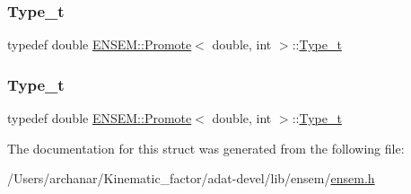 \mbox{\label{structENSEM_1_1Promote_3_01double_00_01int_01_4_ae167376f3956c785560542ee33194136}} 
\subsubsection{\texorpdfstring{Type\_t}{Type\_t}\hspace{0.1cm}{\footnotesize\ttfamily [2/3]}}
{\footnotesize\ttfamily typedef double \mbox{\hyperlink{structENSEM_1_1Promote}{E\+N\+S\+E\+M\+::\+Promote}}$<$ double, int $>$\+::\mbox{\hyperlink{structENSEM_1_1Promote_3_01double_00_01int_01_4_ae167376f3956c785560542ee33194136}{Type\+\_\+t}}}

\mbox{\label{structENSEM_1_1Promote_3_01double_00_01int_01_4_ae167376f3956c785560542ee33194136}} 
\subsubsection{\texorpdfstring{Type\_t}{Type\_t}\hspace{0.1cm}{\footnotesize\ttfamily [3/3]}}
{\footnotesize\ttfamily typedef double \mbox{\hyperlink{structENSEM_1_1Promote}{E\+N\+S\+E\+M\+::\+Promote}}$<$ double, int $>$\+::\mbox{\hyperlink{structENSEM_1_1Promote_3_01double_00_01int_01_4_ae167376f3956c785560542ee33194136}{Type\+\_\+t}}}



The documentation for this struct was generated from the following file\+:\begin{DoxyCompactItemize}
\item 
/\+Users/archanar/\+Kinematic\+\_\+factor/adat-\/devel/lib/ensem/\mbox{\hyperlink{adat-devel_2lib_2ensem_2ensem_8h}{ensem.\+h}}\end{DoxyCompactItemize}
